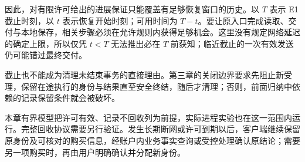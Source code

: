 因此，对有限许可给出的进展保证只能覆盖有足够恢复窗口的历史。以 \(T\) 表示 E1 截止时刻，以 \(t\) 表示恢复开始时刻；可用时间为 \(T-t\)。要让原入口完成读取、交付与本地保存，相关步骤必须在允许规则内获得足够机会。这里没有规定网络延迟的确定上限，所以仅凭 \(t<T\) 无法推出必在 \(T\) 前获知；临近截止的一次有效发送仍可能错过最终交付。

截止也不能成为清理未结束事务的直接理由。第三章的关闭边界要求先阻止新受理，保留在途执行的身份与结果直至安全终结，随后才清理；否则，前面归纳中依赖的记录保留条件就会被破坏。

本章有界模型把许可有效、记录不回收列为前提，实际进程实验也在这一范围内运行。完整回收协议需要另行验证。发生长期断网或许可到期以后，客户端继续保留原身份及可核对的购买信息，经账户内业务事实查询或受控处理确认原结论；需要另一项购买时，再由用户明确确认并分配新身份。
\FloatBarrier
